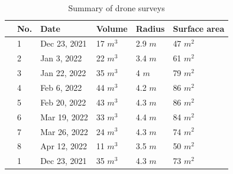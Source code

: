 \documentclass[tc, manuscript]{copernicus}
\begin{document}
\begin{table}
	\centering
	\caption{Summary of drone surveys}
	\label{tab:uav}
	\begin{tabular}{@{}|llllll|@{}}
		\toprule
		\textbf{}              & \textbf{No.} & \textbf{Date} & \textbf{Volume} & \textbf{Radius} & \textbf{Surface area} \\ \midrule
		\multicolumn{1}{|l|}{\multirow{8}{*}{\rotatebox[origin=c]{90}{Traditional}}}
		                       & 1            & Dec 23, 2021  & 17 $m^{3}$     & 2.9 $m$
		                       & 47 $m^{2}$                                                                      \\
		\multicolumn{1}{|l|}{} & 2            & Jan 3, 2022  & 22 $m^{3}$     & 3.4 $m$
		                       & 61 $m^{2}$                                                                      \\
		\multicolumn{1}{|l|}{} & 3            & Jan 22, 2022   & 35 $m^{3}$     & 4 $m$
		                       & 79 $m^{2}$                                                                      \\
		\multicolumn{1}{|l|}{} & 4            & Feb 6, 2022  & 44 $m^{3}$     & 4.2 $m$
		                       & 86 $m^{2}$                                                                      \\
		\multicolumn{1}{|l|}{} & 5            & Feb 20, 2022  & 43 $m^{3}$     & 4.3 $m$
		                       & 86 $m^{2}$                                                                      \\
		\multicolumn{1}{|l|}{} & 6            & Mar 19, 2022  & 33 $m^{3}$     & 4.4 $m$
		                       & 84 $m^{2}$                                                                      \\
		\multicolumn{1}{|l|}{} & 7            & Mar 26, 2022  & 24 $m^{3}$     & 4.3 $m$
		                       & 74 $m^{2}$                                                                      \\
		\multicolumn{1}{|l|}{} & 8            & Apr 12, 2022  & 11 $m^{3}$     & 3.5 $m$
		                       & 50 $m^{2}$                                                                      
		\\\midrule
		\multicolumn{1}{|l|}{\multirow{6}{*}{\rotatebox[origin=c]{90}{Automated}}}
		                       & 1            & Dec 23, 2021  & 35 $m^{3}$      & 4.3 $m$
		                       & 73 $m^{2}$                                                                       \\

\end{tabular}
\end{table}
\end{document}
